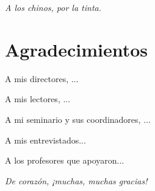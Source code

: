\documentclass[a4paper,12pt]{report}
\begin{document}

\tableofcontents
\pagebreak
\cleardoublepage
\listoffigures %

\cleardoublepage
\listoftables

\cleardoublepage


\thispagestyle{plain}
\begin{flushright}
       \vspace*{3.5cm}
\large
\textsl{A los chinos, por la tinta.}
       \vspace*{0.4cm}   
       \end{flushright}


\chapter*{Agradecimientos} %
{}

A mis directores, ... 

A mis lectores, ... 

A mi seminario y sus coordinadores, ... 

A mis entrevistados...

A los profesores que apoyaron... 


    \textsl{De corazón, ¡muchas, muchas gracias!}


\cleardoublepage

\end{document}
